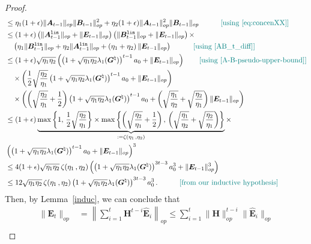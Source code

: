 \begin{proof}
\begin{align*}
    & \leq \eta_1 (1+\epsilon) \|\bm A_{t-1}\|_{op} \|\bm B_{t-1}\|_{op}^2 + \eta_2 (1+\epsilon) \|\bm A_{t-1}\|_{op}^2 \|\bm B_{t-1}\|_{op} \quad \tag*{\color{teal}[using~\cref{eq:concenXX}]} \\
    & \leq (1+\epsilon) \left(\|\bm A^{\tt lin}_{t-1}\|_{op}+\|\bm E_{t-1}\|_{op}\right) \left(\|\bm B^{\tt lin}_{t-1}\|_{op}+\|\bm E_{t-1}\|_{op}\right)\times\\
    & \quad \left(\eta_1 \|\bm B^{\tt lin}_{t-1}\|_{op} + \eta_2 \|\bm A^{\tt lin}_{t-1}\|_{op}+\left(\eta_1+\eta_2\right)\|\bm E_{t-1}\|_{op}\right) \quad \tag*{\color{teal}[using~\cref{AB_t_diff}]} \\
    & \leq (1+\epsilon) \sqrt{\eta_1 \eta_2} \left(\left(1+\sqrt{\eta_1 \eta_2}\lambda_1({\bm G}^{\natural})\right)^{t-1} a_0+\|\bm E_{t-1}\|_{op}\right)\tag*{\color{teal}[using~\cref{A-B-pseudo-upper-bound}]}\\
    &\quad \times \left(\frac{1}{2}\sqrt{\frac{\eta_2}{\eta_1}}\left(1+\sqrt{\eta_1 \eta_2}\lambda_1({\bm G}^{\natural})\right)^{t-1} a_0+\|\bm E_{t-1}\|_{op}\right)\\
    & \quad \times \left(\left(\sqrt{\frac{\eta_2}{\eta_1}} + \frac{1}{2}\right)\left(1+\sqrt{\eta_1 \eta_2}\lambda_1({\bm G}^{\natural})\right)^{t-1} a_0 +\left(\sqrt{\frac{\eta_1}{\eta_2}}+\sqrt{\frac{\eta_2}{\eta_1}}\right)\|\bm E_{t-1}\|_{op}\right)\\
    & \leq (1+\epsilon) \underbrace{\max\left\{1,\,\frac{1}{2}\sqrt{\frac{\eta_2}{\eta_1}}\right\} \times \max\left\{\left(\sqrt{\frac{\eta_2}{\eta_1}} + \frac{1}{2}\right),\,\left(\sqrt{\frac{\eta_1}{\eta_2}}+\sqrt{\frac{\eta_2}{\eta_1}}\right)\right\}}_{:=\zeta(\eta_1\,,\eta_2)}\times \\ 
    & \left(\left(1+\sqrt{\eta_1 \eta_2}\lambda_1({\bm G}^{\natural})\right)^{t-1} a_0+\|\bm E_{t-1}\|_{op}\right)^3\\
    & \leq 4 (1+\epsilon) \sqrt{\eta_1 \eta_2} \,\zeta(\eta_1\,,\eta_2) \left(\left(1+\sqrt{\eta_1 \eta_2}\lambda_1({\bm G}^{\natural})\right)^{3t-3} a_0^3+\|\bm E_{t-1}\|_{op}^3\right)\\
    & \leq 12 \sqrt{\eta_1 \eta_2} \,\zeta(\eta_1\,,\eta_2) \left(1+\sqrt{\eta_1 \eta_2}\lambda_1({\bm G}^{\natural})\right)^{3t-3} a_0^3 \,. \quad \tag*{\color{teal}[from our inductive hypothesis]} 
\end{align*}
Then, by Lemma~\ref{induc}, we can conclude that
\begin{align}
    \|\bm E_t\|_{op} & = \left\|\sum_{i=1}^t \bm H^{t-i} \widehat{\bm E}_i \right\|_{op} \leq \sum_{i=1}^t \|\bm H\|_{op}^{t-i} \|\widehat{\bm E}_i\|_{op}\nonumber\\

\end{align}
\end{proof}
